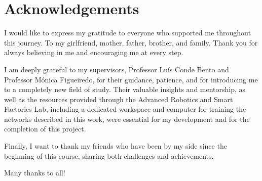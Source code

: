 


% 
% 
% 

\begingroup
\let\clearpage\relax
\let\cleardoublepage\relax
\let\cleardoublepage\relax
\chapter*{Acknowledgements}

I would like to express my gratitude to everyone who supported me throughout this journey. To my girlfriend, mother, father, brother, and family. Thank you for always believing in me and encouraging me at every step.

I am deeply grateful to my supervisors, Professor Luís Conde Bento and Professor Mónica Figueiredo, for their guidance, patience, and for introducing me to a completely new field of study. Their valuable insights and mentorship, as well as the resources provided through the Advanced Robotics and Smart Factories Lab, including a dedicated workspace and computer for training the networks described in this work, were essential for my development and for the completion of this project.

Finally, I want to thank my friends who have been by my side since the beginning of this course, sharing both challenges and achievements.

Many thanks to all!
\endgroup


